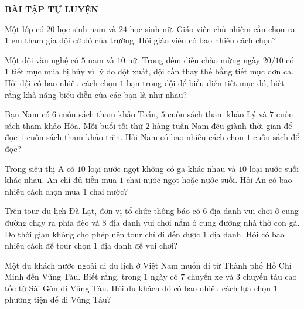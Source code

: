 \begin{center}
\textbf{BÀI TẬP TỰ LUYỆN}
\end{center}
\begin{bt}%
Một lớp có $20$ học sinh nam và $24$ học sinh nữ. Giáo viên chủ nhiệm cần chọn ra $1$ em tham gia đội cờ đỏ của trường. Hỏi giáo viên có bao nhiêu cách chọn?
\end{bt}
\begin{bt}%
Một đội văn nghệ có $5$ nam và $10$ nữ. Trong đêm diễn chào mừng ngày $20/10$ có $1$ tiết mục múa bị hủy vì lý do đột xuất, đội cần thay thế bằng tiết mục đơn ca. Hỏi đội có bao nhiêu cách chọn $1$ bạn trong đội để biểu diễn tiết mục đó, biết rằng khả năng biểu diễn của các bạn là như nhau?
\end{bt}

\begin{bt}%
Bạn Nam có $6$ cuốn sách tham khảo Toán, $5$ cuốn sách tham khảo Lý và $7$ cuốn sách tham khảo Hóa. Mỗi buổi tối thứ $2$ hàng tuần Nam đều giành thời gian để đọc $1$ cuốn sách tham khảo trên. Hỏi Nam có bao nhiêu cách chọn $1$ cuốn sách để đọc?
\end{bt}

\begin{bt}%
Trong siêu thị A có $10$ loại nước ngọt không có ga khác nhau và $10$ loại nước suối khác nhau. An chỉ đủ tiền mua $1$ chai nước ngọt hoặc nước suối. Hỏi An có bao nhiêu cách chọn mua $1$ chai nước?
\end{bt}

\begin{bt}%
Trên tour du lịch Đà Lạt, đơn vị tổ chức thông báo có $6$ địa danh vui chơi ở cung đường chạy ra phía đèo và $8$ địa danh vui chơi nằm ở cung đường nhà thờ con gà. Do thời gian không cho phép nên tour chỉ đi đến được $1$ địa danh. Hỏi có bao nhiêu cách để tour chọn $1$ địa danh để vui chơi?
\end{bt}

\begin{bt}%
Một du khách nước ngoài đi du lịch ở Việt Nam muốn đi từ Thành phố Hồ Chí Minh đến Vũng Tàu. Biết rằng, trong $1$ ngày có $7$ chuyến xe và $3$ chuyến tàu cao tốc  từ Sài Gòn đi Vũng Tàu. Hỏi du khách đó có bao nhiêu cách lựa chọn $1$ phương tiện để đi Vũng Tàu?
\end{bt}


